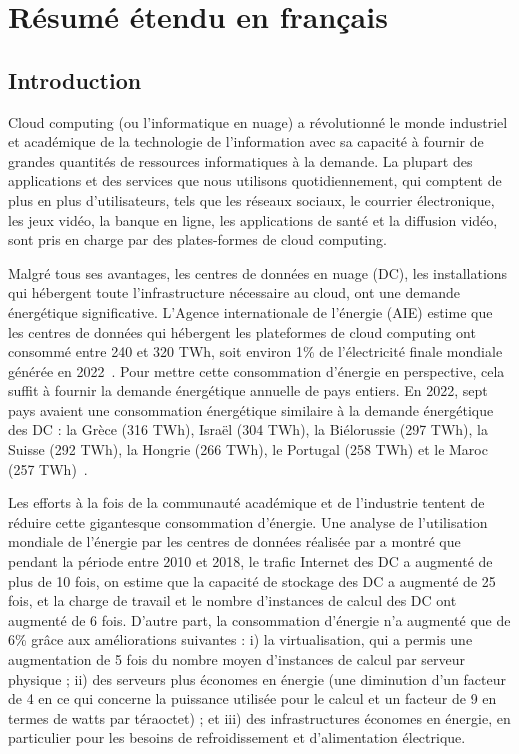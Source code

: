 
\chapter{Résumé étendu en français}


\section{Introduction}

Cloud computing (ou l'informatique en nuage) a révolutionné le monde industriel et académique de la technologie de l'information avec sa capacité à fournir de grandes quantités de ressources informatiques à la demande. La plupart des applications et des services que nous utilisons quotidiennement, qui comptent de plus en plus d'utilisateurs, tels que les réseaux sociaux, le courrier électronique, les jeux vidéo, la banque en ligne, les applications de santé et la diffusion vidéo, sont pris en charge par des plates-formes de cloud computing.


Malgré tous ses avantages, les centres de données en nuage (DC), les installations qui hébergent toute l'infrastructure nécessaire au cloud, ont une demande énergétique significative. L'Agence internationale de l'énergie (AIE) estime que les centres de données qui hébergent les plateformes de cloud computing ont consommé entre 240 et 320 TWh, soit environ 1\% de l'électricité finale mondiale générée en 2022~\cite{IEA_2022}. Pour mettre cette consommation d'énergie en perspective, cela suffit à fournir la demande énergétique annuelle de pays entiers. En 2022, sept pays avaient une consommation énergétique similaire à la demande énergétique des DC : la Grèce (316 TWh), Israël (304 TWh), la Biélorussie (297 TWh), la Suisse (292 TWh), la Hongrie (266 TWh), le Portugal (258 TWh) et le Maroc (257 TWh)~\cite{owidenergy}.

Les efforts à la fois de la communauté académique et de l'industrie tentent de réduire cette gigantesque consommation d'énergie. Une analyse de l'utilisation mondiale de l'énergie par les centres de données réalisée par \citet{masanet2020recalibrating} a montré que pendant la période entre 2010 et 2018, le trafic Internet des DC a augmenté de plus de 10 fois, on estime que la capacité de stockage des DC a augmenté de 25 fois, et la charge de travail et le nombre d'instances de calcul des DC ont augmenté de 6 fois. D'autre part, la consommation d'énergie n'a augmenté que de 6\% grâce aux améliorations suivantes : i) la virtualisation, qui a permis une augmentation de 5 fois du nombre moyen d'instances de calcul par serveur physique ; ii) des serveurs plus économes en énergie (une diminution d'un facteur de 4 en ce qui concerne la puissance utilisée pour le calcul et un facteur de 9 en termes de watts par téraoctet) ; et iii) des infrastructures économes en énergie, en particulier pour les besoins de refroidissement et d'alimentation électrique.



